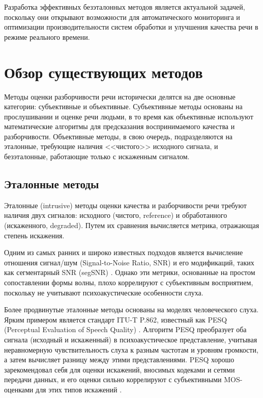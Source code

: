 \documentclass[oneside, final, 14pt]{extarticle}
\begin{document}
Разработка эффективных безэталонных методов является актуальной задачей, поскольку они открывают возможности для автоматического мониторинга и оптимизации производительности систем обработки и улучшения качества речи в режиме реального времени.

\newpage

\section{Обзор существующих методов}

Методы оценки разборчивости речи исторически делятся на две основные категории: субъективные и объективные. Субъективные методы основаны на прослушивании и оценке речи людьми, в то время как объективные используют математические алгоритмы для предсказания воспринимаемого качества и разборчивости. Объективные методы, в свою очередь, подразделяются на эталонные, требующие наличия <<чистого>> исходного сигнала, и безэталонные, работающие только с искаженным сигналом.

\subsection{Эталонные методы}

Эталонные (intrusive) методы оценки качества и разборчивости речи требуют наличия двух сигналов: исходного (чистого, reference) и обработанного (искаженного, degraded). Путем их сравнения вычисляется метрика, отражающая степень искажения.

Одним из самых ранних и широко известных подходов является вычисление отношения сигнал/шум (Signal-to-Noise Ratio, SNR) и его модификаций, таких как сегментарный SNR (segSNR) \cite{DiPersia2007}. Однако эти метрики, основанные на простом сопоставлении формы волны, плохо коррелируют с субъективным восприятием, поскольку не учитывают психоакустические особенности слуха.

Более продвинутые эталонные методы основаны на моделях человеческого слуха. Ярким примером является стандарт ITU-T P.862, известный как PESQ (Perceptual Evaluation of Speech Quality) \cite{Sharma2016, Zha2005}. Алгоритм PESQ преобразует оба сигнала (исходный и искаженный) в психоакустическое представление, учитывая неравномерную чувствительность слуха к разным частотам и уровням громкости, а затем вычисляет разницу между этими представлениями. PESQ хорошо зарекомендовал себя для оценки искажений, вносимых кодеками и сетями передачи данных, и его оценки сильно коррелируют с субъективными MOS-оценками для этих типов искажений \cite{Sharma2016}.
\end{document}
